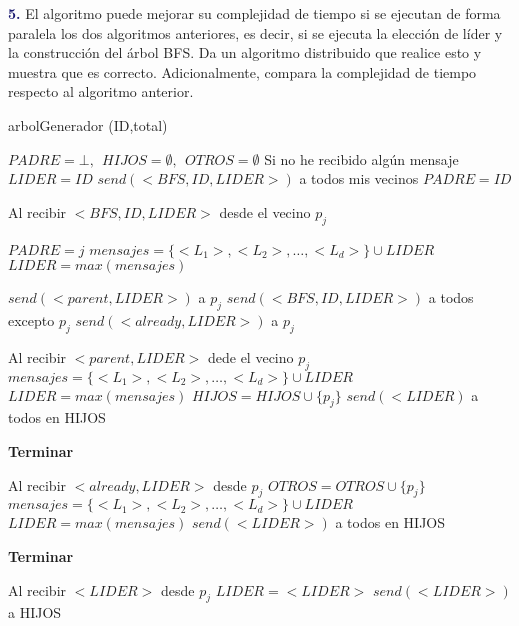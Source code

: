 \newpage
\textbf{\textcolor{MidnightBlue}{5.}} El algoritmo puede mejorar su complejidad de tiempo si se ejecutan de forma paralela
los dos algoritmos anteriores, es decir, si se ejecuta la elección de líder y la construcción del árbol BFS. Da un algoritmo distribuido que realice esto y muestra que es correcto. Adicionalmente, compara la complejidad de tiempo respecto al algoritmo anterior.

\begin{algorithm}
    \caption{arbolGenerador (ID,total)}\label{alg:cap}
    \begin{algorithmic}[1]
        \State $PADRE = \bot, \ \ HIJOS = \emptyset, \ \ OTROS = \emptyset$
        \State Si no he recibido algún mensaje
            \State $LIDER = ID$ 
            \State $send(<BFS,ID,LIDER>)$ a todos mis vecinos
            \State $PADRE = ID$
        \EndIf 


        \State Al recibir $<BFS,ID, LIDER>$ desde el vecino $p_j$

            \State $PADRE = j$
            \State $mensajes=\{<L_1>,<L_2>,\dots,<L_d>\} \cup LIDER$
            \State $LIDER = max(mensajes)$
            
            \State $send(<parent,LIDER>)$ a $p_j$
            \State $send(<BFS,ID, LIDER>)$ a todos excepto $p_j$
        \Else
            \State $send(<already, LIDER>)$ a $p_j$
        \EndIf


        \State Al recibir $<parent,LIDER>$ dede el vecino $p_j$
        \State $mensajes=\{<L_1>,<L_2>,\dots,<L_d>\} \cup LIDER$
        \State $LIDER = max(mensajes)$
        \State $HIJOS = HIJOS \cup \{p_j\}$
        \State $send(<LIDER)$ a todos en HIJOS

            \State \textbf{Terminar}
        \EndIf

        \State Al recibir $<already, LIDER>$ desde $p_j$
        \State $OTROS = OTROS \cup \{p_j\}$
        \State $mensajes=\{<L_1>,<L_2>,\dots,<L_d>\} \cup LIDER$
        \State $LIDER = max(mensajes)$
        \State $send(<LIDER>)$ a todos en HIJOS

            \State \textbf{Terminar}
        \EndIf

        \State Al recibir $<LIDER>$ desde $p_j$
        \State $LIDER = <LIDER>$
        \State $send(<LIDER>)$ a HIJOS

    \end{algorithmic}
\end{algorithm}    



